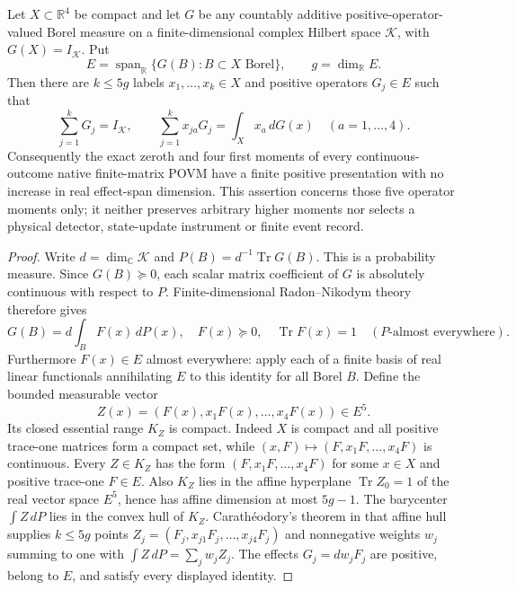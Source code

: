 \documentclass[12pt,a4paper]{article}
\begin{document}
\begin{theorem}
\label{p2c:thm:range-rank-povm-exactification}
Let $X\subset\mathbb R^4$ be compact and let $G$ be any countably
additive positive-operator-valued Borel measure on a finite-dimensional
complex Hilbert space $\mathcal K$, with $G(X)=I_{\mathcal K}$.
Put
\[
 E=\operatorname{span}_{\mathbb R}\{G(B):B\subset X\text{ Borel}\},
 \qquad g=\dim_{\mathbb R} E.
\]
Then there are $k\le5g$ labels $x_1,\ldots,x_k\in X$ and positive
operators $G_j\in E$ such that
\[
 \sum_{j=1}^kG_j=I_{\mathcal K},\qquad
 \sum_{j=1}^k x_{ja}G_j=\int_X x_a\,dG(x)
 \quad(a=1,\ldots,4).
\]
Consequently the exact zeroth and four first moments of every
continuous-outcome native finite-matrix POVM have a finite positive
presentation with no increase in real effect-span dimension.  This
assertion concerns those five operator moments only; it neither
preserves arbitrary higher moments nor selects a physical detector,
state-update instrument or finite event record.
\end{theorem}
\begin{proof}
Write $d=\dim_{\mathbb C}\mathcal K$ and
$P(B)=d^{-1}\operatorname{Tr}G(B)$.  This is a probability measure.
Since $G(B)\succeq0$, each scalar matrix coefficient of $G$ is
absolutely continuous with respect to $P$.  Finite-dimensional
Radon--Nikodym theory therefore gives
\[
 G(B)=d\int_B F(x)\,dP(x),\quad
 F(x)\succeq0,\quad \operatorname{Tr}F(x)=1
 \quad(P\text{-almost everywhere}).
\]
Furthermore $F(x)\in E$ almost everywhere: apply each of a finite
basis of real linear functionals annihilating $E$ to this identity
for all Borel $B$.  Define the bounded measurable vector
\[
 Z(x)=(F(x),x_1F(x),\ldots,x_4F(x))\in E^5.
\]
Its closed essential range $K_Z$ is compact.  Indeed $X$ is compact
and all positive trace-one matrices form a compact set, while
$(x,F)\mapsto(F,x_1F,\ldots,x_4F)$ is continuous.  Every $Z\in K_Z$
has the form $(F,x_1F,\ldots,x_4F)$ for some $x\in X$ and positive
trace-one $F\in E$.  Also $K_Z$ lies in the affine hyperplane
$\operatorname{Tr}Z_0=1$ of the real vector space $E^5$, hence has
affine dimension at most $5g-1$.
The barycenter $\int Z\,dP$ lies in the convex hull of $K_Z$.
Carath\'eodory's theorem in that affine hull supplies $k\le5g$
points $Z_j=(F_j,x_{j1}F_j,\ldots,x_{j4}F_j)$ and nonnegative
weights $w_j$ summing to one with
$\int Z\,dP=\sum_j w_jZ_j$.  The effects $G_j=dw_jF_j$
are positive, belong to $E$, and satisfy every displayed identity.
\end{proof}
\end{document}
